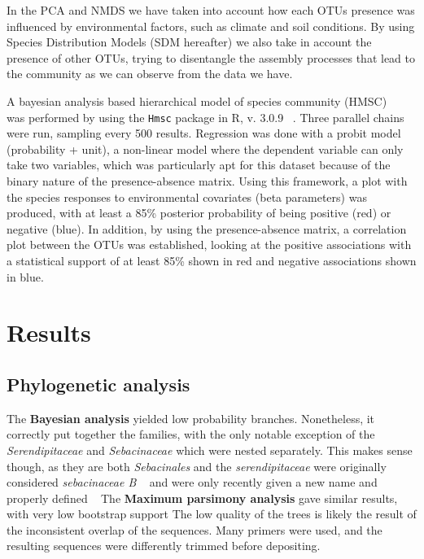 In the PCA and NMDS we have taken into account how each OTUs presence was influenced by environmental factors, such as climate and soil conditions. By using Species Distribution Models (SDM hereafter) we also take in account the presence of other OTUs, trying to disentangle the assembly processes that lead to the community as we can observe from the data we have.

A bayesian analysis based hierarchical model of species community (HMSC) ~\citep{ovaskainen2017} was performed by using the \texttt{Hmsc} package in R, v. 3.0.9 ~\citep{tikhonov2020, hmsc-r2021}.
Three parallel chains were run, sampling every 500 results. Regression was done with a probit model (probability + unit), a non-linear model where the dependent variable can only take two variables, which was particularly apt for this dataset because of the binary nature of the presence-absence matrix.
Using this framework, a plot with the species responses to environmental covariates (beta parameters) was produced, with at least a 85\% posterior probability of being positive (red) or negative (blue).
In addition, by using the presence-absence matrix, a correlation plot between the OTUs was established, looking at the positive associations with a statistical support of at least 85\% shown in red and negative associations shown in blue.

\part{Results}
\label{results}

\chapter{Phylogenetic analysis}
\label{phylogeneticanalysis}

The \textbf{Bayesian analysis} yielded low probability branches. Nonetheless, it correctly put together the families, with the only notable exception of the \emph{Serendipitaceae} and \emph{Sebacinaceae} which were nested separately. This makes sense though, as they are both \emph{Sebacinales} and the \emph{serendipitaceae} were originally considered \emph{sebacinaceae B} ~\citep{weiss2004} and were only recently given a new name and properly defined ~\citep{weiss2016}
The \textbf{Maximum parsimony analysis} gave similar results, with very low bootstrap support
The low quality of the trees is likely the result of the inconsistent overlap of the sequences. Many primers were used, and the resulting sequences were differently trimmed before depositing.

